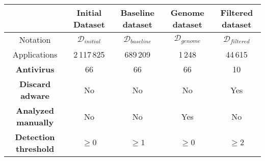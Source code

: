 \begin{tabular}{|c|c|c|c|c|}
    \hline
    & Initial Dataset & Baseline dataset &  Genome dataset & Filtered dataset \\ \hline
    Notation & $\mathcal{D}_{initial}$& $\mathcal{D}_{baseline}$& $\mathcal{D}_{genome} $& $\mathcal{D}_{filtered}$\\%
    Applications & 2\,117\,825 & 689\,209 & 1\,248 & 44\,615 \\%
    \textbf{Antivirus} & 66 & 66 & 66 & 10 \\%
    \textbf{Discard adware} & No & No & No & Yes \\%
    \textbf{Analyzed manually} & No & No & Yes & No \\%
    \textbf{Detection threshold} & $\geq 0$& $\geq 1$& $\geq 0$& $\geq 2$ \\
    \hline
\end{tabular}
